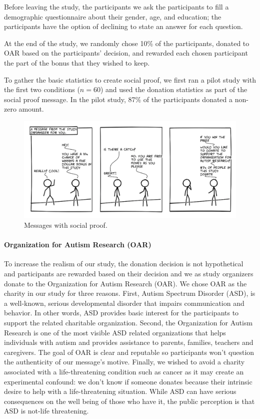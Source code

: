 Before leaving the study, the participants we ask the participants to fill a demographic questionnaire about their gender, age, and education; the participants have the option of declining to state an answer for each question.

At the end of the study, we randomly chose 10\% of the participants, donated to OAR based on the participants' decision, and rewarded each chosen participant the part of the bonus that they wished to keep.

To gather the basic statistics to create social proof, we first ran a pilot study with the first two conditions ($n=60$) and used the donation statistics as part of the social proof message. In the pilot study, 87\% of the participants donated a non-zero amount. 



\begin{figure}[bt]
	\centering
	\includegraphics[width=\columnwidth]{./figures/social_proof.png}
	\caption{Messages with social proof.}
	\label{fig:basic three comic social proof}
\end{figure}

\paragraph{Organization for Autism Research (OAR)}
To increase the realism of our study, the donation decision is not hypothetical and participants are rewarded based on their decision and we as study organizers donate to the Organization for Autism Research (OAR). We chose OAR as the charity in our study for three reasons. First, Autism Spectrum Disorder (ASD), is a well-known, serious developmental disorder that impairs communication and behavior. In other words, ASD provides basic interest for the participants to support the related charitable organization. Second, the Organization for Autism Research is one of the most visible ASD related organizations that helps individuals with autism and provides assistance to parents, families, teachers and caregivers. The goal of OAR is clear and reputable so participants won't question the authenticity of our message's motive. Finally, we wished to avoid a charity associated with a life-threatening condition such as cancer as it may create an experimental confound: we don't know if someone donates because their intrinsic desire to help with a life-threatening situation. While ASD can have serious consequences on the well being of those who have it, the public perception is that ASD is not-life threatening. 

